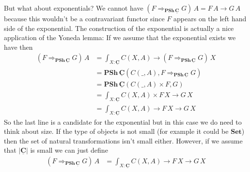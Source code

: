 \documentclass{article}
\newcommand{\Set}{\mathbf{Set}}
\newcommand{\cat}[1]{\underline{\mathbf{#1}}}
\newcommand{\obj}[1]{|#1|}
\newcommand{\PSh}{\mathbf{PSh}}
\newcommand{\expC}[3]{#2\Rightarrow_{#1} #3}
\begin{document}
But what about exponentials? We cannot have $(\expC{\PSh\,\cat{C}}{F}{G})\,A = F\,A \to G\,A$ because this wouldn't be a contravariant functor since $F$ appears on the left hand side of the exponential. The construction of the exponential is actually a nice application of the Yoneda lemma: 
If we assume that the exponential exists we have then 
\begin{align*}
(\expC{\PSh\,\cat{C}}{F}{G})\,A 
& = \int_{X:\cat{C}}C(X,A) \to (\expC{\PSh\,\cat{C}}{F}{G})\,X \\
& = \PSh\,\cat{C}(C(\_,A),\expC{\PSh\,\cat{C}}{F}{G}) \\
& = \PSh\,\cat{C}(C(\_,A) \times F,G) \\
& = \int_{X:\cat{C}}C(X,A)\times F\,X \to G\,X\\
& = \int_{X:\cat{C}}C(X,A)\to F\,X \to G\,X
\end{align*}
So the last line is a candidate for the exponential but in this case we do need to think about size. If the type of objects is not small (for example it could be $\Set$) then the set of natural transformations isn't small either. However, if we assume that $\obj{\cat{C}}$ is small we can just define
\begin{align*}
(\expC{\PSh\,\cat{C}}{F}{G})\,A & = \int_{X:\cat{C}}C(X,A)\to F\,X \to G\,X
\end{align*}
\end{document}
